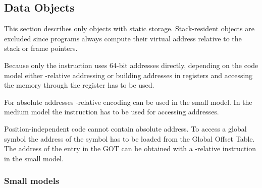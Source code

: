 \subsection{Data Objects}

This section describes only objects with static storage.
Stack-resident objects are excluded since programs always compute
their virtual address relative to the stack or frame pointers.

Because only the  instruction uses 64-bit addresses
directly, depending on the code model either \RIP-relative addressing
or building addresses in registers and accessing the memory through
the register has to be used.

For absolute addresses \RIP-relative encoding can be used in the small
model.  In the medium model the  instruction has to be
used for accessing addresses.

Position-independent code cannot contain absolute address.  To access
a global symbol the address of the symbol has to be loaded from the
Global Offset Table.  The address of the entry in the GOT can be
obtained with a \RIP-relative instruction in the small model.

\subsubsection{Small models}

